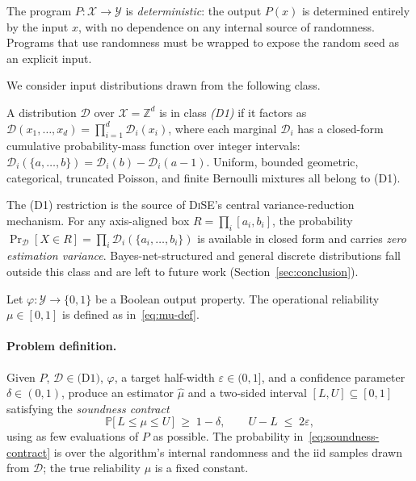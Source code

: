 \documentclass[runningheads]{llncs}
\providecommand{\Cref}[1]{Section~\ref{#1}}
\newcommand{\inX}{\mathcal{X}}
\newcommand{\inY}{\mathcal{Y}}
\newcommand{\dist}{\mathcal{D}}
\newcommand{\prog}{P}
\newcommand{\prop}{\varphi}
\newcommand{\mutrue}{\mu}
\newcommand{\muhat}{\hat{\mu}}
\newcommand{\toolname}{\textsc{DiSE}}
\begin{document}
\begin{assumption*}\label{ass:program}
  The program $\prog : \inX \to \inY$ is \emph{deterministic}: the
  output $\prog(x)$ is determined entirely by the input $x$, with no
  dependence on any internal source of randomness.  Programs that use
  randomness must be wrapped to expose the random seed as an explicit
  input.
\end{assumption*}

We consider input distributions drawn from the following class.

\begin{definition}%
  \label{def:d1}
  A distribution $\dist$ over $\inX = \mathbb{Z}^d$ is in class
  \emph{(D1)} if it factors as
  $\dist(x_1, \ldots, x_d) = \prod_{i=1}^d \dist_i(x_i)$,
  where each marginal $\dist_i$ has a closed-form cumulative
  probability-mass function over integer intervals:
  $\dist_i(\{a, \ldots, b\}) = \dist_i(b) - \dist_i(a-1)$.
  Uniform, bounded geometric, categorical, truncated Poisson, and
  finite Bernoulli mixtures all belong to (D1).
\end{definition}

The (D1) restriction is the source of \toolname{}'s central
variance-reduction mechanism.  For any axis-aligned box
$R = \prod_i [a_i, b_i]$, the probability
$\Pr_\dist[X \in R] = \prod_i \dist_i(\{a_i, \ldots, b_i\})$ is
available in closed form and carries \emph{zero estimation variance}.
Bayes-net-structured and general discrete distributions fall outside
this class and are left to future work (\Cref{sec:conclusion}).

Let $\prop : \inY \to \{0,1\}$ be a Boolean output property.  The
operational reliability $\mutrue \in [0,1]$ is defined as
in~\eqref{eq:mu-def}.

\paragraph{Problem definition.}
Given $\prog$, $\dist \in \text{(D1)}$, $\prop$, a target half-width
$\varepsilon \in (0,1]$, and a confidence parameter $\delta \in (0,1)$,
produce an estimator $\muhat$ and a two-sided interval
$[L,U] \subseteq [0,1]$ satisfying the \emph{soundness contract}
\begin{equation}\label{eq:soundness-contract}
  \mathbb{P}\!\big[\,L \le \mutrue \le U\,\big] \;\ge\; 1 - \delta,
  \qquad
  U - L \;\le\; 2\varepsilon,
\end{equation}
using as few evaluations of $\prog$ as possible.  The probability
in~\eqref{eq:soundness-contract} is over the algorithm's internal
randomness and the iid samples drawn from $\dist$; the true
reliability $\mutrue$ is a fixed constant.
\end{document}
